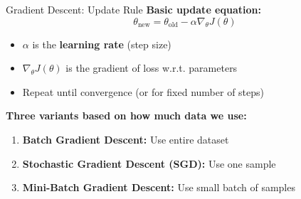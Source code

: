 \begin{frame}{Gradient Descent: Update Rule}
\textbf{Basic update equation:}
\[
\theta_{\text{new}} = \theta_{\text{old}} - \alpha \nabla_\theta J(\theta)
\]

\begin{itemize}
\item $\alpha$ is the \textbf{learning rate} (step size)
\item $\nabla_\theta J(\theta)$ is the gradient of loss w.r.t. parameters
\item Repeat until convergence (or for fixed number of steps)
\end{itemize}

\pause
\vspace{0.5em}
\textbf{Three variants based on how much data we use:}
\begin{enumerate}
\item \textbf{Batch Gradient Descent:} Use entire dataset
\item \textbf{Stochastic Gradient Descent (SGD):} Use one sample
\item \textbf{Mini-Batch Gradient Descent:} Use small batch of samples
\end{enumerate}
\end{frame}
